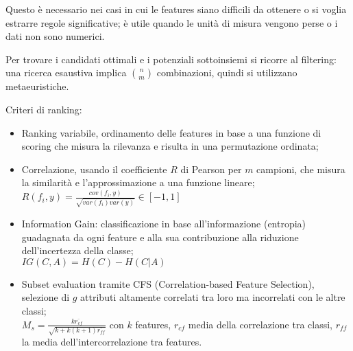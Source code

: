 Questo è necessario nei casi in cui le features siano difficili da ottenere o si voglia estrarre regole significative; è utile quando le unità di misura vengono perse o i dati non sono numerici.

Per trovare i candidati ottimali e i potenziali sottoinsiemi si ricorre al filtering: una ricerca esaustiva implica $\binom{n}{m}$ combinazioni, quindi si utilizzano metaeuristiche. 

Criteri di ranking:
\begin{itemize}
	\item Ranking variabile, ordinamento delle features in base a una funzione di scoring che misura la rilevanza e risulta in una permutazione ordinata;
	\item Correlazione, usando il coefficiente $R$ di Pearson per $m$ campioni, che misura la similarità e l'approssimazione a una funzione lineare; \\
	$R(f_i, y) = \frac{cov(f_i, y)}{\sqrt{var(f_i)var(y)}} \in [-1, 1]$
	\item Information Gain: classificazione in base all'informazione (entropia) guadagnata da ogni feature e alla sua contribuzione alla riduzione dell'incertezza della classe; \\
	$IG(C, A) = H(C) - H(C | A)$
	\item Subset evaluation tramite CFS (Correlation-based Feature Selection), selezione di $g$ attributi altamente correlati tra loro ma incorrelati con le altre classi; \\
	$M_s = \frac{k\overline{r_{cf}}}{\sqrt{k + k(k + 1)\overline{r_{ff}}}}$ con $k$ features, $r_{cf}$ media della correlazione tra classi, $r_{ff}$ la media dell'intercorrelazione tra features.
	\end{itemize}